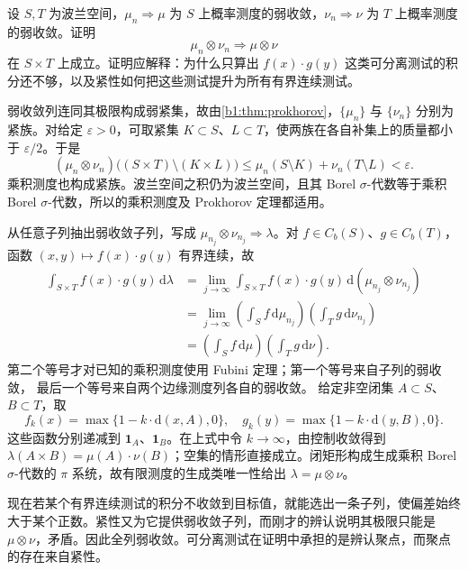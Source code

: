 \begin{optionalexercise}\label{b1:ex:12-product-limits}
设 \(S,T\) 为波兰空间，\(\mu_n\Rightarrow\mu\) 为 \(S\) 上概率测度的弱收敛，\(\nu_n\Rightarrow\nu\) 为 \(T\) 上概率测度的弱收敛。证明
\[
 \mu_n\otimes\nu_n\Rightarrow\mu\otimes\nu
\]
在 \(S\times T\) 上成立。证明应解释：为什么只算出 \(f(x)\cdot g(y)\) 这类可分离测试的积分还不够，以及紧性如何把这些测试提升为所有有界连续测试。
\end{optionalexercise}
\begin{solution}
弱收敛列连同其极限构成弱紧集，故由\cref{b1:thm:prokhorov}，\(\{\mu_n\}\) 与 \(\{\nu_n\}\) 分别为紧族。对给定 \(\varepsilon>0\)，可取紧集 \(K\subset S\)、\(L\subset T\)，使两族在各自补集上的质量都小于 \(\varepsilon/2\)。于是
\[
 (\mu_n\otimes\nu_n)\bigl((S\times T)\setminus(K\times L)\bigr)
 \le\mu_n(S\setminus K)+\nu_n(T\setminus L)<\varepsilon.
\]
乘积测度也构成紧族。波兰空间之积仍为波兰空间，且其 Borel \(\sigma\)-代数等于乘积 Borel \(\sigma\)-代数，所以的乘积测度及 Prokhorov 定理都适用。

从任意子列抽出弱收敛子列，写成
\(\mu_{n_j}\otimes\nu_{n_j}\Rightarrow\lambda\)。对
\(f\in C_b(S)\)、\(g\in C_b(T)\)，函数 \((x,y)\mapsto f(x)\cdot g(y)\) 有界连续，故
\[
 \begin{aligned}
 \int_{S\times T}f(x)\cdot g(y)\,\mathrm d\lambda
 &=\lim_{j\to\infty}\int_{S\times T}f(x)\cdot g(y)\,
     \mathrm d(\mu_{n_j}\otimes\nu_{n_j})\\
 &=\lim_{j\to\infty}
   \left(\int_Sf\,\mathrm d\mu_{n_j}\right)
   \left(\int_Tg\,\mathrm d\nu_{n_j}\right)\\
 &=\left(\int_Sf\,\mathrm d\mu\right)
   \left(\int_Tg\,\mathrm d\nu\right).
 \end{aligned}
\]
第二个等号才对已知的乘积测度使用 Fubini 定理；第一个等号来自子列的弱收敛，
最后一个等号来自两个边缘测度列各自的弱收敛。
给定非空闭集 \(A\subset S\)、\(B\subset T\)，取
\[
 f_k(x)=\max\{1-k\cdot \mathrm{d}(x,A),0\},\quad
 g_k(y)=\max\{1-k\cdot \mathrm{d}(y,B),0\}.
\]
这些函数分别递减到 \(\mathbf1_A\)、\(\mathbf1_B\)。在上式中令 \(k\to\infty\)，由控制收敛得到
\(\lambda(A\times B)=\mu(A)\cdot\nu(B)\)；空集的情形直接成立。闭矩形构成生成乘积 Borel \(\sigma\)-代数的 \(\pi\) 系统，故有限测度的生成类唯一性给出 \(\lambda=\mu\otimes\nu\)。

现在若某个有界连续测试的积分不收敛到目标值，就能选出一条子列，使偏差始终大于某个正数。紧性又为它提供弱收敛子列，而刚才的辨认说明其极限只能是 \(\mu\otimes\nu\)，矛盾。因此全列弱收敛。可分离测试在证明中承担的是辨认聚点，而聚点的存在来自紧性。
\end{solution}

